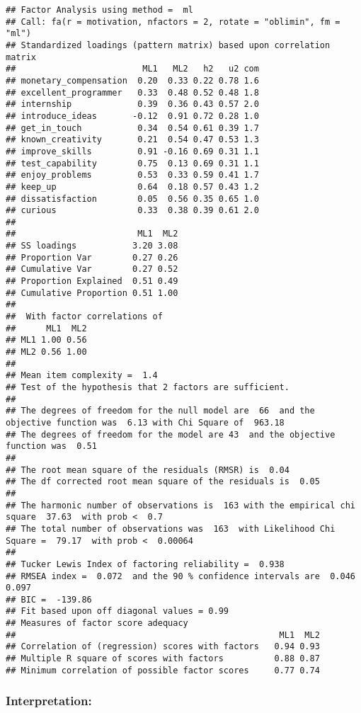 \documentclass[
]{article}
\begin{document}
\begin{verbatim}
## Factor Analysis using method =  ml
## Call: fa(r = motivation, nfactors = 2, rotate = "oblimin", fm = "ml")
## Standardized loadings (pattern matrix) based upon correlation matrix
##                         ML1   ML2   h2   u2 com
## monetary_compensation  0.20  0.33 0.22 0.78 1.6
## excellent_programmer   0.33  0.48 0.52 0.48 1.8
## internship             0.39  0.36 0.43 0.57 2.0
## introduce_ideas       -0.12  0.91 0.72 0.28 1.0
## get_in_touch           0.34  0.54 0.61 0.39 1.7
## known_creativity       0.21  0.54 0.47 0.53 1.3
## improve_skills         0.91 -0.16 0.69 0.31 1.1
## test_capability        0.75  0.13 0.69 0.31 1.1
## enjoy_problems         0.53  0.33 0.59 0.41 1.7
## keep_up                0.64  0.18 0.57 0.43 1.2
## dissatisfaction        0.05  0.56 0.35 0.65 1.0
## curious                0.33  0.38 0.39 0.61 2.0
## 
##                        ML1  ML2
## SS loadings           3.20 3.08
## Proportion Var        0.27 0.26
## Cumulative Var        0.27 0.52
## Proportion Explained  0.51 0.49
## Cumulative Proportion 0.51 1.00
## 
##  With factor correlations of 
##      ML1  ML2
## ML1 1.00 0.56
## ML2 0.56 1.00
## 
## Mean item complexity =  1.4
## Test of the hypothesis that 2 factors are sufficient.
## 
## The degrees of freedom for the null model are  66  and the objective function was  6.13 with Chi Square of  963.18
## The degrees of freedom for the model are 43  and the objective function was  0.51 
## 
## The root mean square of the residuals (RMSR) is  0.04 
## The df corrected root mean square of the residuals is  0.05 
## 
## The harmonic number of observations is  163 with the empirical chi square  37.63  with prob <  0.7 
## The total number of observations was  163  with Likelihood Chi Square =  79.17  with prob <  0.00064 
## 
## Tucker Lewis Index of factoring reliability =  0.938
## RMSEA index =  0.072  and the 90 % confidence intervals are  0.046 0.097
## BIC =  -139.86
## Fit based upon off diagonal values = 0.99
## Measures of factor score adequacy             
##                                                    ML1  ML2
## Correlation of (regression) scores with factors   0.94 0.93
## Multiple R square of scores with factors          0.88 0.87
## Minimum correlation of possible factor scores     0.77 0.74
\end{verbatim}

\hypertarget{interpretation-6}{%
\subsubsection{Interpretation:}\label{interpretation-6}}
\end{document}
